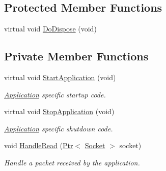 \subsection*{Protected Member Functions}
\begin{DoxyCompactItemize}
\item 
virtual void \hyperlink{classns3_1_1PacketSocketServer_a2958bd54bb9a6c8d1ece84b0c54228bb}{Do\+Dispose} (void)
\end{DoxyCompactItemize}
\subsection*{Private Member Functions}
\begin{DoxyCompactItemize}
\item 
virtual void \hyperlink{classns3_1_1PacketSocketServer_ab0ede0184063258690b5501c52644045}{Start\+Application} (void)
\begin{DoxyCompactList}\small\item\em \hyperlink{classns3_1_1Application}{Application} specific startup code. \end{DoxyCompactList}\item 
virtual void \hyperlink{classns3_1_1PacketSocketServer_a54fddf2f15957f64f061bd42bd44a052}{Stop\+Application} (void)
\begin{DoxyCompactList}\small\item\em \hyperlink{classns3_1_1Application}{Application} specific shutdown code. \end{DoxyCompactList}\item 
void \hyperlink{classns3_1_1PacketSocketServer_a2ffc59a7b69f44af5f45fe8e9cf2fc85}{Handle\+Read} (\hyperlink{classns3_1_1Ptr}{Ptr}$<$ \hyperlink{classns3_1_1Socket}{Socket} $>$ socket)
\begin{DoxyCompactList}\small\item\em Handle a packet received by the application. \end{DoxyCompactList}\end{DoxyCompactItemize}
